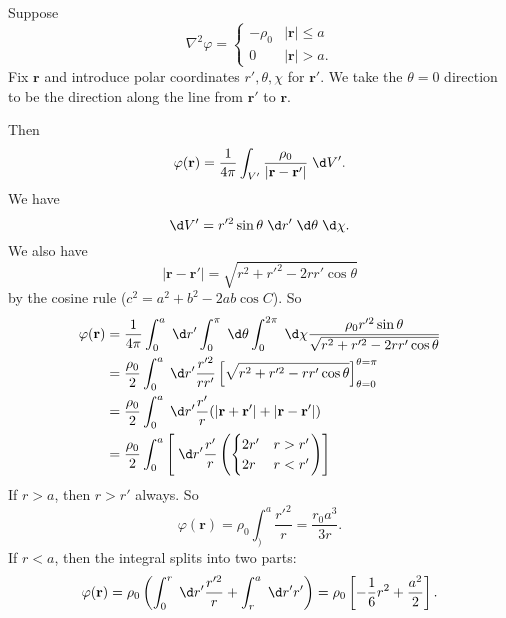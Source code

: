\documentclass[a4paper]{article}
\begin{document}
\begin{eg}
  Suppose
  \[
    \nabla^2 \varphi =
    \begin{cases}
      -\rho_0 & |\mathbf{r}| \leq a\\
      0 & |\mathbf{r}| > a.
    \end{cases}
  \]
  Fix $\mathbf{r}$ and introduce polar coordinates $r', \theta, \chi$ for $\mathbf{r}'$. We take the $\theta = 0$ direction to be the direction along the line from $\mathbf{r}'$ to $\mathbf{r}$.

  Then
  \[
    \varphi(\mathbf{r}) = \frac{1}{4\pi}\int_{V'}\frac{\rho_0}{|\mathbf{r} - \mathbf{r}'|}\;\d V'.
  \]
  We have
  \[
    \d V' = r'^2 \sin \theta\;\d r'\;\d \theta\;\d \chi.
  \]
  We also have
  \[
    |\mathbf{r} - \mathbf{r}'| = \sqrt{r^2 + r'^2 - 2rr'\cos \theta}
  \]
  by the cosine rule ($c^2 = a^2 + b^2 - 2ab\cos C$). So
  \begin{align*}
    \varphi(\mathbf{r}) &= \frac{1}{4\pi}\int_0^a \;\d r'\int_0^\pi \;\d \theta \int_0^{2\pi}\;\d \chi \frac{\rho_0 r'^2 \sin \theta}{\sqrt{r^2 + r'^2 - 2rr'\cos \theta}}\\
    &= \frac{\rho_0}{2}\int_0^a \;\d r' \frac{r'^2}{rr'}\left[\sqrt{r^2 + r'^2 - rr'\cos \theta}\right]^{\theta = \pi}_{\theta = 0}\\
    &= \frac{\rho_0}{2}\int_0^a \;\d r' \frac{r'}{r}(|\mathbf{r} + \mathbf{r}'| + |\mathbf{r} - \mathbf{r}'|)\\
    &= \frac{\rho_0}{2}\int_0^a\left[ \;\d r' \frac{r'}{r}\left(
      \begin{cases}
        2r' & r > r'\\
        2r & r < r'
    \end{cases}\right)\right]
  \end{align*}
  If $r > a$, then $r > r'$ always. So
  \[
    \varphi(\mathbf{r}) = \rho_0 \int_)^a \frac{r'^2}{r} = \frac{r_0 a^3}{3r}.
  \]
  If $r < a$, then the integral splits into two parts:
  \[
    \varphi(\mathbf{r}) = \rho_0\left(\int_0^r \;\d r' \frac{r'^2}{r} + \int_r^a \;\d r' r'\right) = \rho_0\left[-\frac{1}{6}r^2 + \frac{a^2}{2}\right].
  \]
\end{eg}
\end{document}
